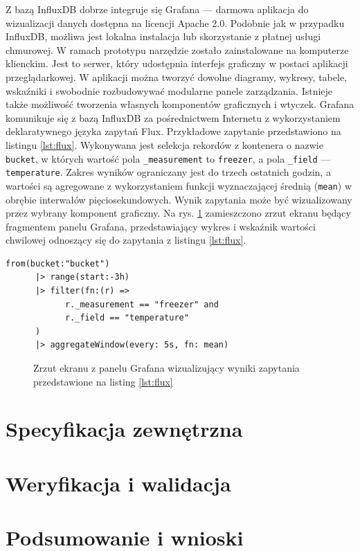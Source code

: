 \documentclass[a4paper, 12pt, twoside]{article}
\begin{document}
Z bazą InfluxDB dobrze integruje się Grafana --- darmowa aplikacja do wizualizacji
danych dostępna na licencji Apache 2.0. Podobnie jak
w przypadku InfluxDB, możliwa jest lokalna instalacja lub skorzystanie z 
płatnej usługi chmurowej. W ramach prototypu narzędzie zostało zainstalowane
na komputerze klienckim. Jest to serwer, który udostępnia interfejs graficzny
w postaci aplikacji przeglądarkowej. W aplikacji można tworzyć
dowolne diagramy, wykresy, tabele, wskaźniki i swobodnie rozbudowywać 
modularne panele zarządzania. Istnieje także możliwość tworzenia własnych komponentów
graficznych i wtyczek. 
Grafana komunikuje się z bazą InfluxDB za pośrednictwem Internetu z wykorzystaniem
deklaratywnego języka zapytań Flux. Przykładowe zapytanie przedstawiono na 
listingu \ref{lst:flux}. Wykonywana jest selekcja
rekordów z kontenera o nazwie \texttt{bucket}, w których wartość pola 
\texttt{\_measurement} to \texttt{freezer}, a pola \texttt{\_field} --- \texttt{temperature}.
Zakres wyników ograniczany jest do trzech ostatnich godzin, a wartości
są agregowane z wykorzystaniem funkcji wyznaczającej średnią (\texttt{mean}) w obrębie interwałów
pięciosekundowych. Wynik zapytania może być wizualizowany przez wybrany komponent
graficzny. Na rys. \ref{fig:grafana-1} zamieszczono zrzut ekranu będący fragmentem panelu Grafana,
przedstawiający wykres i wskaźnik wartości chwilowej odnoszący się do zapytania
z listingu \ref{lst:flux}.


\begin{lstlisting}[caption={Przykładowe zapytanie w języku Flux}, label={lst:flux}]
from(bucket:"bucket")
      |> range(start:-3h)
      |> filter(fn:(r) =>
            r._measurement == "freezer" and
            r._field == "temperature"
      )
      |> aggregateWindow(every: 5s, fn: mean)
\end{lstlisting}

\begin{figure}[h]
      \centering
      \caption{Zrzut ekranu z panelu Grafana wizualizujący wyniki zapytania przedstawione na listing \ref{lst:flux}}
      \label{fig:grafana-1}
\end{figure}

\section{Specyfikacja zewnętrzna}\label{spec-wew}

\section{Weryfikacja i walidacja}\label{testy}

\section{Podsumowanie i wnioski}\label{wnioski}

\printbibliography
\end{document}
